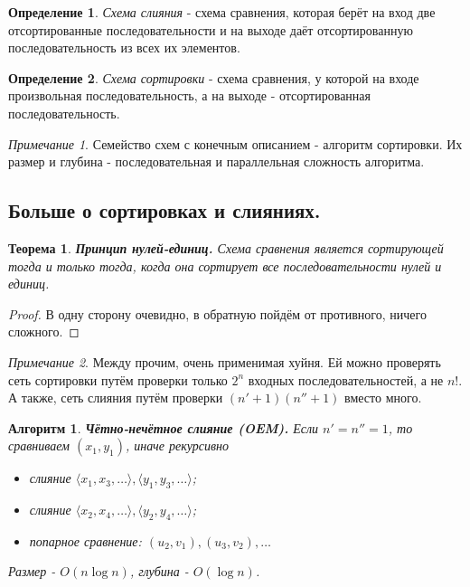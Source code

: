 \documentclass[a4paper]{article}
\theoremstyle{indented}
\newtheorem{theorem}{Теорема}
\newtheorem{alg}{Алгоритм}
\theoremstyle{definition}
\newtheorem{defn}{Определение}
\theoremstyle{remark}
\newtheorem{remark}{Примечание}
\begin{document}
\begin{defn}
    \textit{Схема слияния} - схема сравнения, которая берёт на вход две отсортированные последовательности и на выходе даёт отсортированную последовательность из всех их элементов.
\end{defn}

\begin{defn}
    \textit{Схема сортировки} - схема сравнения, у которой на входе произвольная последовательность, а на выходе - отсортированная последовательность.
\end{defn}

\begin{remark}
    Семейство схем с конечным описанием - алгоритм сортировки. Их размер и глубина - последовательная и параллельная сложность алгоритма. 
\end{remark}

\subsection{Больше о сортировках и слияниях.}

\begin{theorem}
    \textbf{Принцип нулей-единиц.} Схема сравнения является сортирующей тогда и только тогда, когда она сортирует все последовательности нулей и единиц.
\end{theorem}

\begin{proof}
    В одну сторону очевидно, в обратную пойдём от противного, ничего сложного.
\end{proof}

\begin{remark}
    Между прочим, очень применимая хуйня. Ей можно проверять сеть сортировки путём проверки только $2^n$ входных последовательностей, а не $n!$. А также, сеть слияния путём проверки $(n'+1)(n''+1)$ вместо много.
\end{remark}

\begin{alg}
    \textbf{Чётно-нечётное слияние (OEM).} Если $n'=n''=1$, то сравниваем $(x_1, y_1)$, иначе рекурсивно

    \begin{itemize}
        \item слияние $\langle x_1, x_3, \ldots \rangle , \langle y_1, y_3, \ldots \rangle$; 
        \item слияние $\langle x_2, x_4, \ldots \rangle , \langle y_2, y_4, \ldots \rangle$;
        \item попарное сравнение: $(u_2, v_1), (u_3, v_2), \ldots$
    \end{itemize}

    Размер - $O(n\log n)$, глубина - $O(\log n)$. 
\end{alg}
\end{document}
